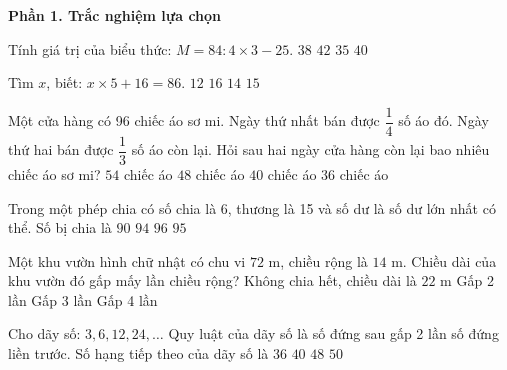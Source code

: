 \textbf{Phần 1. Trắc nghiệm lựa chọn}

\begin{ex} %
Tính giá trị của biểu thức: $M = 84 : 4 \times 3 - 25$.
\choice
{\True $38$}
{$42$}
{$35$}
{$40$}
\end{ex}

\begin{ex} %
Tìm $x$, biết: $x \times 5 + 16 = 86$.
\choice
{$12$}
{$16$}
{\True $14$}
{$15$}
\end{ex}

\begin{ex} %
Một cửa hàng có 96 chiếc áo sơ mi. Ngày thứ nhất bán được $\dfrac{1}{4}$ số áo đó. Ngày thứ hai bán được $\dfrac{1}{3}$ số áo còn lại. Hỏi sau hai ngày cửa hàng còn lại bao nhiêu chiếc áo sơ mi?
\choice
{$54$ chiếc áo}
{\True $48$ chiếc áo}
{$40$ chiếc áo}
{$36$ chiếc áo}
\end{ex}

\begin{ex} %
Trong một phép chia có số chia là 6, thương là 15 và số dư là số dư lớn nhất có thể. Số bị chia là
\choice
{$90$}
{$94$}
{$96$}
{\True $95$}
\end{ex}

\begin{ex} %
Một khu vườn hình chữ nhật có chu vi $72\text{ m}$, chiều rộng là $14\text{ m}$. Chiều dài của khu vườn đó gấp mấy lần chiều rộng?
\choice
{\True Không chia hết, chiều dài là $22\text{ m}$}
{Gấp 2 lần}
{Gấp 3 lần}
{Gấp 4 lần}
\end{ex}

\begin{ex} %
Cho dãy số: $3, 6, 12, 24, \dots$ Quy luật của dãy số là số đứng sau gấp 2 lần số đứng liền trước. Số hạng tiếp theo của dãy số là
\choice
{$36$}
{$40$}
{\True $48$}
{$50$}
\end{ex}

